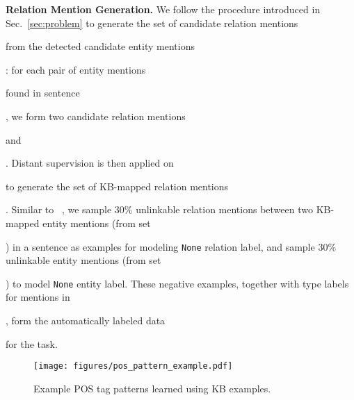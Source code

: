 \documentclass[letterpaper]{sig-alternate-2013}
\begin{document}
\smallskip\noindent
\textsf{\small\textbf{Relation Mention Generation.}}
We follow the procedure introduced in Sec.~\ref{sec:problem} to generate the set of candidate relation mentions \begin{small}\end{small} from the detected candidate entity mentions \begin{small}\end{small}: for each pair of entity mentions \begin{small}\end{small} found in sentence \begin{small}\end{small}, we form two candidate relation mentions \begin{small}\end{small} and \begin{small}\end{small}.
Distant supervision is then applied on \begin{small}\end{small} to generate the set of KB-mapped relation mentions \begin{small}\end{small}. Similar to ~\cite{mintz2009distant,hoffmann2011multiR}, we sample 30\% unlinkable relation mentions between two KB-mapped entity mentions (from set \begin{small}\end{small}) in a sentence as examples for modeling \texttt{None} relation label, and sample 30\% unlinkable entity mentions (from set \begin{small}\end{small}) to model \texttt{None} entity label. These negative examples, together with type labels for mentions in \begin{small}\end{small}, form the automatically labeled data \begin{small}\end{small} for the task.








\begin{figure}
\centering
\vspace{-0.3cm}
\texttt{[image: figures/pos\_pattern\_example.pdf]}
\caption{Example POS tag patterns learned using KB examples.}
\label{figure:pos_pattern}
\end{figure}
\end{document}
